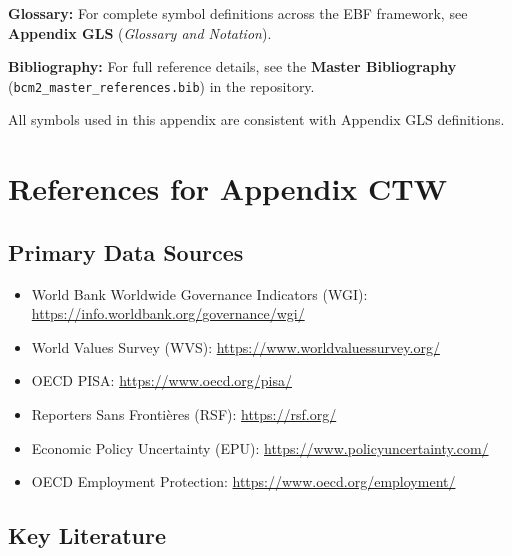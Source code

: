 \begin{tcolorbox}[colback=blue!5!white, colframe=blue!75!black, 
    title=\textbf{Central References}]

\textbf{Glossary:} For complete symbol definitions across the EBF framework, 
see \textbf{Appendix GLS} (\textit{Glossary and Notation}).

\textbf{Bibliography:} For full reference details, see the 
\textbf{Master Bibliography} (\texttt{bcm2\_master\_references.bib}) 
in the repository.

All symbols used in this appendix are consistent with Appendix GLS definitions.

\end{tcolorbox}

\section{References for Appendix CTW}
\label{sec:V-references}

\subsection{Primary Data Sources}

\begin{itemize}[nosep]
    \item World Bank Worldwide Governance Indicators (WGI): \url{https://info.worldbank.org/governance/wgi/}
    \item World Values Survey (WVS): \url{https://www.worldvaluessurvey.org/}
    \item OECD PISA: \url{https://www.oecd.org/pisa/}
    \item Reporters Sans Frontières (RSF): \url{https://rsf.org/}
    \item Economic Policy Uncertainty (EPU): \url{https://www.policyuncertainty.com/}
    \item OECD Employment Protection: \url{https://www.oecd.org/employment/}
\end{itemize}

\subsection{Key Literature}

